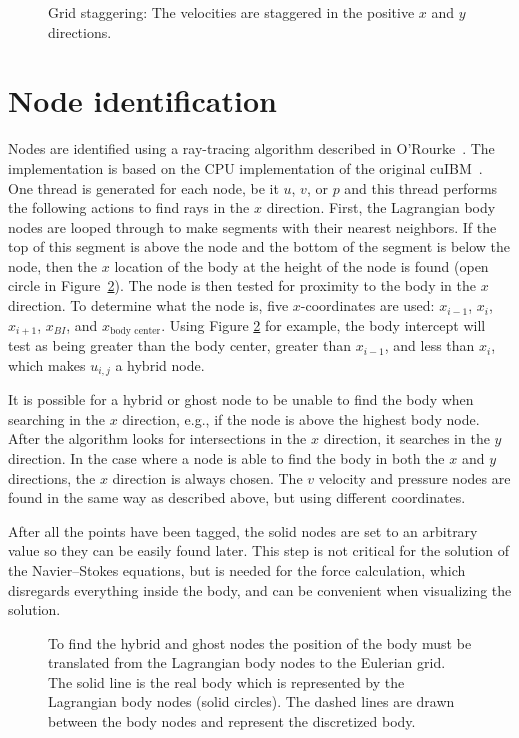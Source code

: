 \begin{figure}[!htb]
	\centering
	
	\caption{Grid staggering: The velocities are staggered in the positive $x$ and $y$ directions.}
	\label{fig:stagger}
\end{figure}

\section{Node identification}
Nodes are identified using a ray-tracing algorithm described in O'Rourke~\cite{o1998computational}.
The implementation is based on the CPU implementation of the original cuIBM~\cite{krishnan2012validation}. 
One thread is generated for each node, be it $u$, $v$, or $p$ and this thread performs the following actions to find rays in the $x$ direction. 
First, the Lagrangian body nodes are looped through to make segments with their nearest neighbors. 
If the top of this segment is above the node and the bottom of the segment is below the node, then the $x$ location of the body at the height of the node is found (open circle in Figure~\ref{fig:node id 1}).
The node is then tested for proximity to the body in the $x$ direction. 
To determine what the node is, five $x$-coordinates are used: $x_{i-1}$, $x_{i}$, $x_{i+1}$, $x_{BI}$, and $x_{\text{body center}}$. 
Using Figure \ref{fig:node id 1} for example, the body intercept will test as being greater than the body center, greater than $x_{i-1}$, and less than $x_{i}$, which makes $u_{i,j}$ a hybrid node. 

It is possible for a hybrid or ghost node to be unable to find the body when searching in the $x$ direction, e.g., if the node is above the highest body node. 
After the algorithm looks for intersections in the $x$ direction, it searches in the $y$ direction. 
In the case where a node is able to find the body in both the $x$ and $y$ directions, the $x$ direction is always chosen. 
The $v$ velocity and pressure nodes are found in the same way as described above, but using different coordinates. 

After all the points have been tagged, the solid nodes are set to an arbitrary value so they can be easily found later.
This step is not critical for the solution of the Navier--Stokes equations, but is needed for the force calculation, which disregards everything inside the body, and can be convenient when visualizing the solution. 
\begin{figure}
	\centering
	
	\caption{To find the hybrid and ghost nodes the position of the body must be translated from the Lagrangian body nodes to the Eulerian grid. The solid line is the real body which is represented by the Lagrangian body nodes (solid circles). The dashed lines are drawn between the body nodes and represent the discretized body.}
	\label{fig:node id 1}
\end{figure}

